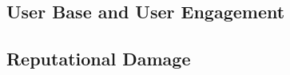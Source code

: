 \documentclass[12pt, a4paper]{article}
\begin{document}


\subsection*{User Base and User Engagement}




\subsection*{Reputational Damage}





\end{document}
